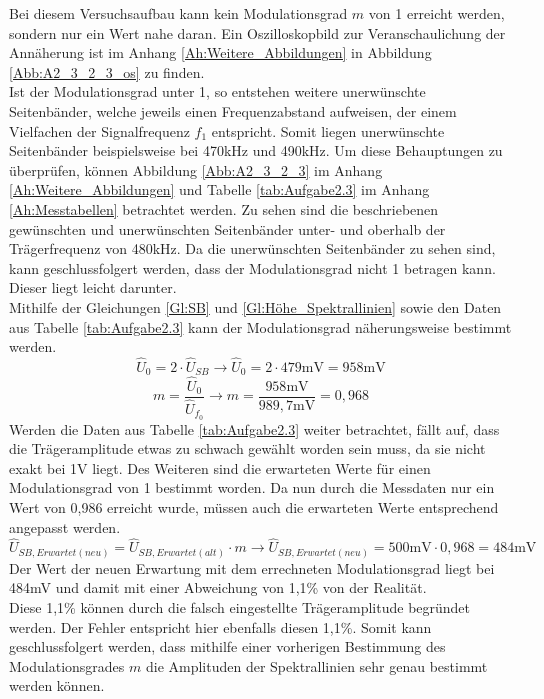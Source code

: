 \documentclass[12pt]{scrartcl}
\begin{document}
Bei diesem Versuchsaufbau kann kein Modulationsgrad $m$ von 1 erreicht werden, sondern nur ein Wert nahe daran. 
Ein Oszilloskopbild zur Veranschaulichung der Annäherung ist im Anhang \ref{Ah:Weitere_Abbildungen} in Abbildung \ref{Abb:A2_3_2_3_os} zu finden.\\
Ist der Modulationsgrad unter 1, so entstehen weitere unerwünschte Seitenbänder, welche jeweils einen Frequenzabstand aufweisen, der einem Vielfachen der Signalfrequenz $f_1$ entspricht.
Somit liegen unerwünschte Seitenbänder beispielsweise bei 470kHz und 490kHz.
\newline
\newline
Um diese Behauptungen zu überprüfen, können Abbildung \ref{Abb:A2_3_2_3} im Anhang \ref{Ah:Weitere_Abbildungen} und Tabelle \ref{tab:Aufgabe2.3} im Anhang \ref{Ah:Messtabellen} betrachtet werden.
Zu sehen sind die beschriebenen gewünschten und unerwünschten Seitenbänder unter- und oberhalb der Trägerfrequenz von 480kHz.
Da die unerwünschten Seitenbänder zu sehen sind, kann geschlussfolgert werden, dass der Modulationsgrad nicht 1 betragen kann. 
Dieser liegt leicht darunter.\\
Mithilfe der Gleichungen \ref{Gl:SB} und \ref{Gl:Höhe_Spektrallinien} sowie den Daten aus Tabelle \ref{tab:Aufgabe2.3} kann der Modulationsgrad näherungsweise bestimmt werden.
\begin{equation*}
  \hat{U}_0 = 2 \cdot \hat{U}_{SB} \rightarrow \hat{U}_0 = 2 \cdot 479\text{mV} = 958\text{mV}
\end{equation*}
\begin{equation*}
    m=\frac{\hat{U}_0}{\hat{U}_{f_0}} \rightarrow m=\frac{958\text{mV}}{989,7\text{mV}}=0,968
\end{equation*}
Werden die Daten aus Tabelle \ref{tab:Aufgabe2.3} weiter betrachtet, fällt auf, dass die Trägeramplitude etwas zu schwach gewählt worden sein muss, da sie nicht exakt bei 1V liegt. 
Des Weiteren sind die erwarteten Werte für einen Modulationsgrad von 1 bestimmt worden. Da nun durch die Messdaten nur ein Wert von 0,986 erreicht wurde, müssen auch die erwarteten Werte entsprechend angepasst werden. 
\begin{equation*}
    \hat{U}_{SB,Erwartet(neu)} =\hat{U}_{SB,Erwartet(alt)} \cdot m \rightarrow \hat{U}_{SB,Erwartet(neu)}= 500\text{mV}\cdot 0,968 = 484 \text{mV}
\end{equation*}
Der Wert der neuen Erwartung mit dem errechneten Modulationsgrad liegt bei 484mV und damit mit einer Abweichung von 1,1\% von der Realität.\\
Diese 1,1\% können durch die falsch eingestellte Trägeramplitude begründet werden. 
Der Fehler entspricht hier ebenfalls diesen 1,1\%. 
Somit kann geschlussfolgert werden, dass mithilfe einer vorherigen Bestimmung des Modulationsgrades $m$ die Amplituden der Spektrallinien sehr genau bestimmt werden können.
\end{document}
